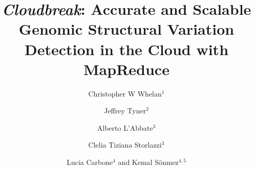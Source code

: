 \documentclass[10pt]{bmc_article}
\newenvironment{bmcformat}{\fussy\setboolean{publ}{true}}{\fussy}
\begin{document}
\begin{bmcformat}



\title{{\em Cloudbreak}: Accurate and Scalable Genomic Structural Variation Detection in the Cloud with MapReduce}
 


\author{Christopher W Whelan\correspondingauthor$^{1}$%
      \and
         Jeffrey Tyner$^2$%
      \and
         Alberto L'Abbate$^3$%
      \and
         Clelia Tiziana Storlazzi$^3$
      \and
         Lucia Carbone$^4$
       and 
         Kemal S\"onmez\correspondingauthor$^{4,5}$%
      }
      


\address{%
    \iid(1)Institute on Development and Disability and Center for Spoken Language Understanding, Oregon Health \& Science University, %
    3181 SW Sam Jackson Park Rd, GH40, Portland, OR 97239-3098\\
    \iid(2)Program in Molecular and Cellular Biosciences, Oregon Health \& Science University, %
    3181 SW Sam Jackson Park Rd, L102, Portland, OR 97239\\
    \iid(3)Department of Biology, University of Bari ``Aldo Moro'', Via G. Amendola 165/A, 70126, Bari, Italy\\
    \iid(4)Department of Behavioral Neuroscience, Oregon Health \& Science University, %
    3181 SW Sam Jackson Park Rd, L470, Portland, Oregon, U.S.A. 97239-3098\\
    \iid(5)Department of Medical Informatics \& Clinical Epidemiology, Oregon Health \& Science University, %
    3181 S.W. Sam Jackson Park Rd., BICC, Portland, Oregon, U.S.A. 97239-3098
}%


\end{bmcformat}
\end{document}
